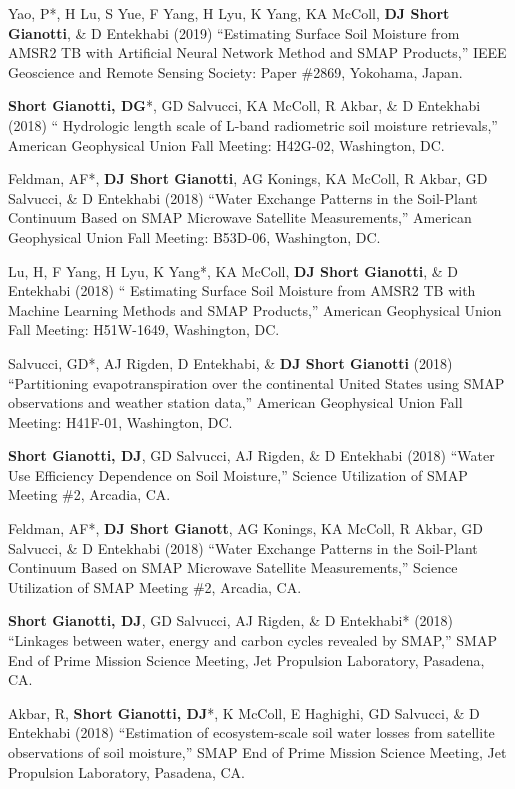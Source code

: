 \documentclass[10pt, a4paper]{article}
\newcommand{\lbr}{\vspace*{12pt}}
\newcommand{\years}[1]{\mbox{}\marginnote{\scriptsize #1}} %
\begin{document}
\years{2019} Yao, P*, H Lu, S Yue, F Yang, H Lyu, K Yang, KA McColl, \textbf{DJ Short Gianotti}, \& D Entekhabi (2019) ``Estimating Surface Soil Moisture from AMSR2 TB with Artificial Neural Network Method and SMAP Products,'' IEEE Geoscience and Remote Sensing Society: Paper \#2869, Yokohama, Japan.\lbr 
 
\years{2018}\textbf{Short Gianotti, DG}*, GD Salvucci, KA McColl, R Akbar, \& D Entekhabi (2018) `` Hydrologic length scale of L-band radiometric soil moisture retrievals,'' American Geophysical Union Fall Meeting: H42G-02, Washington, DC.\lbr

\years{2018}Feldman, AF*, \textbf{DJ Short Gianotti}, AG Konings, KA McColl, R Akbar, GD Salvucci, \& D Entekhabi (2018) ``Water Exchange Patterns in the Soil-Plant Continuum Based on SMAP Microwave Satellite Measurements,'' American Geophysical Union Fall Meeting: B53D-06, Washington, DC.\lbr

\years{2018}Lu, H, F Yang, H Lyu, K Yang*, KA McColl, \textbf{DJ Short Gianotti}, \& D Entekhabi (2018) `` Estimating Surface Soil Moisture from AMSR2 TB with Machine Learning Methods and SMAP Products,'' American Geophysical Union Fall Meeting: H51W-1649, Washington, DC.\lbr

\years{2018}Salvucci, GD*, AJ Rigden, D Entekhabi, \& \textbf{DJ Short Gianotti} (2018) ``Partitioning evapotranspiration over the continental United States using SMAP observations and weather station data,'' American Geophysical Union Fall Meeting: H41F-01, Washington, DC.\lbr

\years{2018}\textbf{Short Gianotti, DJ}, GD Salvucci, AJ Rigden, \& D Entekhabi (2018) ``Water Use Efficiency Dependence on Soil Moisture,'' Science Utilization of SMAP Meeting \#2, Arcadia, CA.\lbr %

\years{2018}Feldman, AF*, \textbf{DJ Short Gianott}, AG Konings, KA McColl, R Akbar, GD Salvucci, \& D Entekhabi (2018) ``Water Exchange Patterns in the Soil-Plant Continuum Based on SMAP Microwave Satellite Measurements,'' Science Utilization of SMAP Meeting \#2, Arcadia, CA.\lbr %

\years{2018}\textbf{Short Gianotti, DJ}, GD Salvucci, AJ Rigden, \& D Entekhabi* (2018) ``Linkages between water, energy and carbon cycles revealed by SMAP,'' SMAP End of Prime Mission Science Meeting, Jet Propulsion Laboratory, Pasadena, CA. \lbr %

\years{2018}Akbar, R, \textbf{Short Gianotti, DJ}*, K McColl, E Haghighi, GD Salvucci, \& D Entekhabi (2018) ``Estimation of ecosystem-scale soil water losses from satellite observations of soil moisture,'' SMAP End of Prime Mission Science Meeting, Jet Propulsion Laboratory, Pasadena, CA. \lbr %
\end{document}
